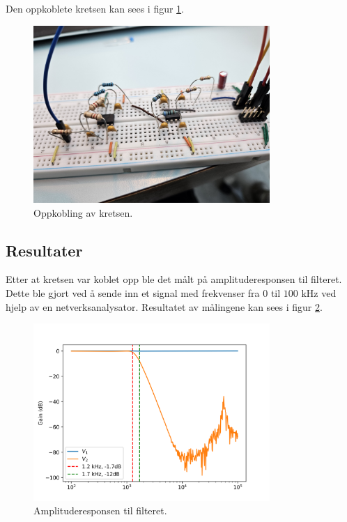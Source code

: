 Den oppkoblete kretsen kan sees i figur \ref{fig:oppkobling}.

\begin{figure}[!h]
    \centering
    \includegraphics[width=0.8\textwidth]{Bilder/OppkoblingButterworth.jpg}
    \caption{Oppkobling av kretsen.}
    \label{fig:oppkobling}
\end{figure}
\newpage
\subsection{Resultater}
Etter at kretsen var koblet opp ble det målt på amplituderesponsen til filteret. Dette ble gjort ved å sende inn et signal med frekvenser fra $0$ til $100\text{ kHz}$ ved hjelp av en netverksanalysator. Resultatet av målingene kan sees i figur \ref{fig:amplituderespons}.



\begin{figure}[!h]
    \centering
    \includegraphics[width=0.8\textwidth]{Bilder/bode.png}
    \caption{Amplituderesponsen til filteret.}
    \label{fig:amplituderespons}    
\end{figure}

\newpage